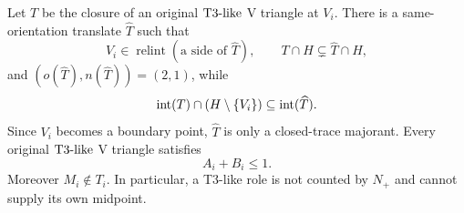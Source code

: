 \begin{proposition}
\label{prop:t3-translation}
\label{lem:app-t3-translation-calculation}

Let $T$ be the closure of an original $\mathrm{T3\text{-}like}$ V triangle at $V_i$.  There is
a same-orientation translate $\widehat T$ such that
\[
 V_i\in\operatorname{relint}(\text{a side of }\widehat T),
 \qquad T\cap H\subsetneq\widehat T\cap H,
\]
and $(o(\widehat T),n(\widehat T))=(2,1)$, while
\[
 \mathrm{int}(T)\cap(H\setminus\{V_i\})\subseteq\mathrm{int}(\widehat T).
\]
Since $V_i$ becomes a boundary point, $\widehat T$ is only a closed-trace
majorant.
\label{lem:t3-nonsupercritical}
Every original $\mathrm{T3\text{-}like}$ V triangle satisfies
\begin{equation}
 A_i+B_i\le1.
 \label{eq:t3-nonsupercritical}
\end{equation}
Moreover $M_i\notin T_i$. In particular, a T3-like role is not counted
by $N_+$ and cannot supply its own midpoint.

\end{proposition}
